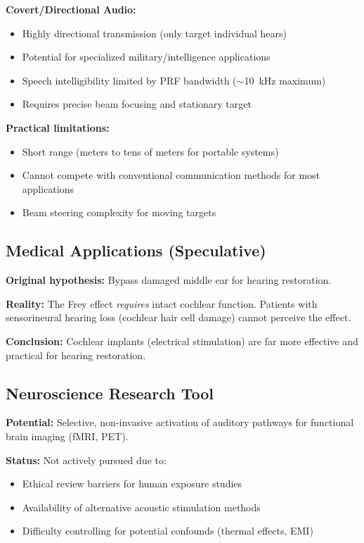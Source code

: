 \textbf{Covert/Directional Audio:}
\begin{itemize}
\item Highly directional transmission (only target individual hears)
\item Potential for specialized military/intelligence applications
\item Speech intelligibility limited by PRF bandwidth ($\sim$10~kHz maximum)
\item Requires precise beam focusing and stationary target
\end{itemize}

\textbf{Practical limitations:}
\begin{itemize}
\item Short range (meters to tens of meters for portable systems)
\item Cannot compete with conventional communication methods for most applications
\item Beam steering complexity for moving targets
\end{itemize}

\subsection{Medical Applications (Speculative)}

\textbf{Original hypothesis:} Bypass damaged middle ear for hearing restoration.

\textbf{Reality:} The Frey effect \emph{requires} intact cochlear function. Patients with sensorineural hearing loss (cochlear hair cell damage) cannot perceive the effect.

\textbf{Conclusion:} Cochlear implants (electrical stimulation) are far more effective and practical for hearing restoration.

\subsection{Neuroscience Research Tool}

\textbf{Potential:} Selective, non-invasive activation of auditory pathways for functional brain imaging (fMRI, PET).

\textbf{Status:} Not actively pursued due to:
\begin{itemize}
\item Ethical review barriers for human exposure studies
\item Availability of alternative acoustic stimulation methods
\item Difficulty controlling for potential confounds (thermal effects, EMI)
\end{itemize}

